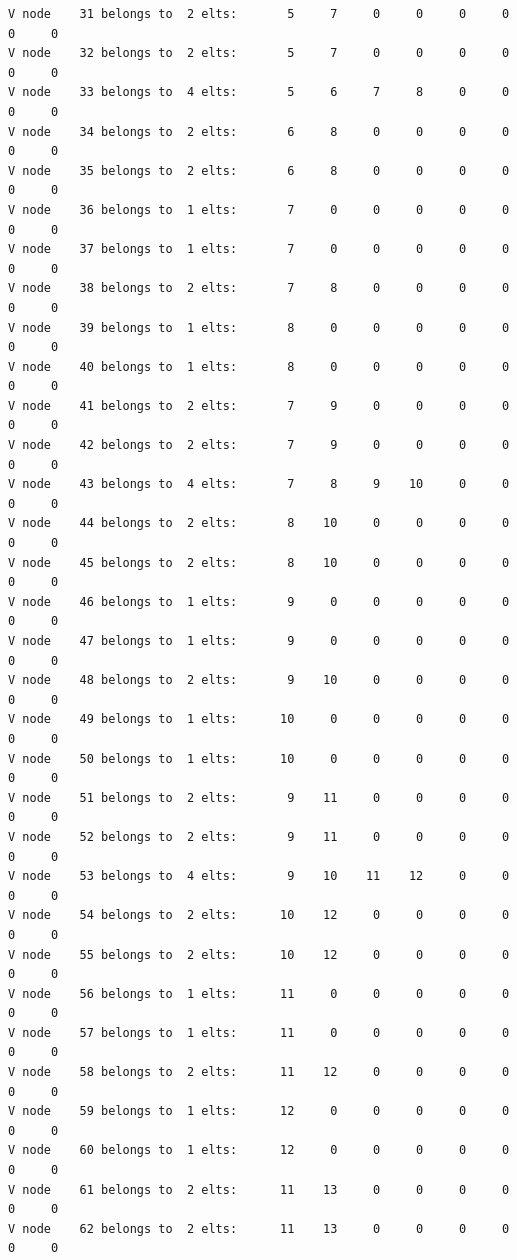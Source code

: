 \begin{small}
\begin{verbatim}
V node    31 belongs to  2 elts:       5     7     0     0     0     0     0     0
V node    32 belongs to  2 elts:       5     7     0     0     0     0     0     0
V node    33 belongs to  4 elts:       5     6     7     8     0     0     0     0
V node    34 belongs to  2 elts:       6     8     0     0     0     0     0     0
V node    35 belongs to  2 elts:       6     8     0     0     0     0     0     0
V node    36 belongs to  1 elts:       7     0     0     0     0     0     0     0
V node    37 belongs to  1 elts:       7     0     0     0     0     0     0     0
V node    38 belongs to  2 elts:       7     8     0     0     0     0     0     0
V node    39 belongs to  1 elts:       8     0     0     0     0     0     0     0
V node    40 belongs to  1 elts:       8     0     0     0     0     0     0     0
V node    41 belongs to  2 elts:       7     9     0     0     0     0     0     0
V node    42 belongs to  2 elts:       7     9     0     0     0     0     0     0
V node    43 belongs to  4 elts:       7     8     9    10     0     0     0     0
V node    44 belongs to  2 elts:       8    10     0     0     0     0     0     0
V node    45 belongs to  2 elts:       8    10     0     0     0     0     0     0
V node    46 belongs to  1 elts:       9     0     0     0     0     0     0     0
V node    47 belongs to  1 elts:       9     0     0     0     0     0     0     0
V node    48 belongs to  2 elts:       9    10     0     0     0     0     0     0
V node    49 belongs to  1 elts:      10     0     0     0     0     0     0     0
V node    50 belongs to  1 elts:      10     0     0     0     0     0     0     0
V node    51 belongs to  2 elts:       9    11     0     0     0     0     0     0
V node    52 belongs to  2 elts:       9    11     0     0     0     0     0     0
V node    53 belongs to  4 elts:       9    10    11    12     0     0     0     0
V node    54 belongs to  2 elts:      10    12     0     0     0     0     0     0
V node    55 belongs to  2 elts:      10    12     0     0     0     0     0     0
V node    56 belongs to  1 elts:      11     0     0     0     0     0     0     0
V node    57 belongs to  1 elts:      11     0     0     0     0     0     0     0
V node    58 belongs to  2 elts:      11    12     0     0     0     0     0     0
V node    59 belongs to  1 elts:      12     0     0     0     0     0     0     0
V node    60 belongs to  1 elts:      12     0     0     0     0     0     0     0
V node    61 belongs to  2 elts:      11    13     0     0     0     0     0     0
V node    62 belongs to  2 elts:      11    13     0     0     0     0     0     0

\end{verbatim}
\end{small}
